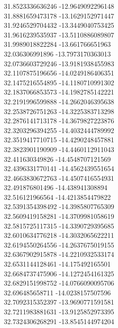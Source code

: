 {31.8523336636246	-12.9649092296148\\
31.8881659473178	-13.1629152971447\\
31.9246529704432	-13.3449040753425\\
31.9616239535937	-13.5110886089807\\
31.9989018822284	-13.661766651963\\
32.036306991896	-13.7973170363013\\
32.0736603729246	-13.9181938455983\\
32.1107875196656	-14.0249186406351\\
32.1475216554895	-14.1180710991302\\
32.1837066853573	-14.1982785142221\\
32.2191996599888	-14.2662046395638\\
32.2538726751263	-14.3225383713298\\
32.2876141713178	-14.3679827223876\\
32.3203296394255	-14.4032444789992\\
32.3519417710715	-14.4290248457881\\
32.3823901190909	-14.4460112911043\\
32.411630349826	-14.4548707121569\\
32.4396331770141	-14.4562439551654\\
32.4663830672763	-14.4507416554931\\
32.491876801496	-14.438941308894\\
32.516121966564	-14.4213854479822\\
32.5391354398492	-14.3985807765309\\
32.5609419158281	-14.3709981058619\\
32.5815725117315	-14.3390729395685\\
32.6010634776218	-14.3032065622211\\
32.6194550264556	-14.2637675019155\\
32.6367902915878	-14.2210932533174\\
32.6531144128461	-14.175492165501\\
32.6684737475906	-14.1272454161325\\
32.6829151998752	-14.0766090095706\\
32.696485658711	-14.0238157507596\\
32.7092315352397	-13.9690771591581\\
32.7211983881631	-13.9125852973395\\
32.7324306268291	-13.8545144974204\\
}

